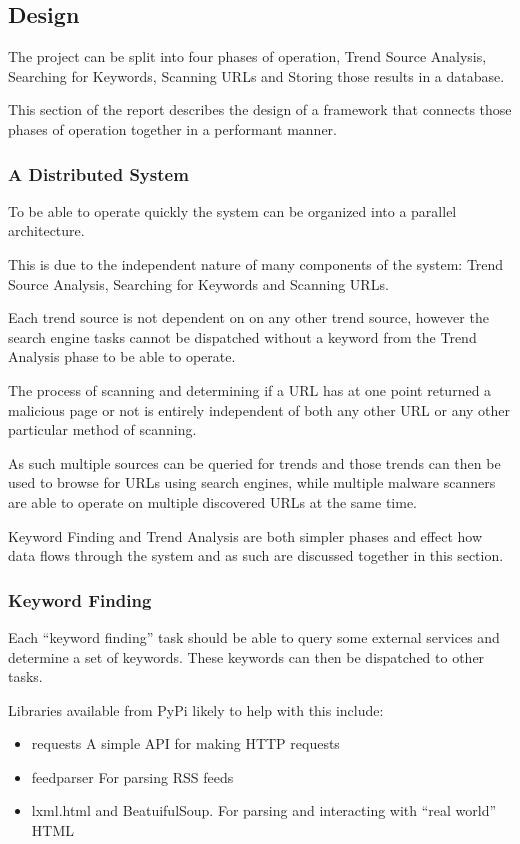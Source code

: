 \subsection{Design}
The project can be split into four phases of operation, Trend Source Analysis, Searching for Keywords, Scanning URLs and Storing those results in a database.

This section of the report describes the design of a framework that connects those phases of operation together in a performant manner.

\subsubsection{A Distributed System}
To be able to operate quickly the system can be organized into a parallel architecture.

This is due to the independent nature of many components of the system: Trend Source Analysis, Searching for Keywords and Scanning URLs.

Each trend source is not dependent on on any other trend source, however the search engine tasks cannot be dispatched without a keyword from the Trend Analysis phase to be able to operate.

The process of scanning and determining if a URL has at one point returned a malicious page or not is entirely independent of both any other URL or any other particular method of scanning.

As such multiple sources can be queried for trends and those trends can then be used to browse for URLs using search engines, while multiple malware scanners are able to operate on multiple discovered URLs at the same time.

Keyword Finding and Trend Analysis are both simpler phases and effect how data flows through the system and as such are discussed together in this section.

\subsubsection{Keyword Finding}
Each ``keyword finding'' task should be able to query some external services and determine a set of keywords. These keywords can then be dispatched to other tasks.

Libraries available from PyPi likely to help with this include:

\begin{itemize}
    \item requests A simple API for making HTTP requests
    \item feedparser For parsing RSS feeds
    \item lxml.html and BeatuifulSoup. For parsing and interacting with ``real world'' HTML
\end{itemize}

